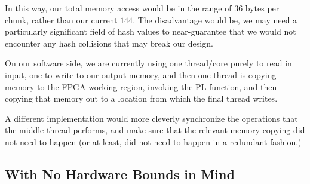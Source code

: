 \documentclass{article}
\begin{document}
\par
In this way, our total memory access would be in the range of $36$ bytes per chunk, rather than our current $144$. The disadvantage would be, we may need a particularly significant field of hash values to near-guarantee that we would not encounter any hash collisions that may break our design.
\newline\par
On our software side, we are currently using one thread/core purely to read in input, one to write to our output memory, and then one thread is copying memory to the FPGA working region, invoking the PL function, and then copying that memory out to a location from which the final thread writes.
\newline\par
A different implementation would more cleverly synchronize the operations that the middle thread performs, and make sure that the relevant memory copying did not need to happen (or at least, did not need to happen in a redundant fashion.)

\subsection{With No Hardware Bounds in Mind}
\end{document}
